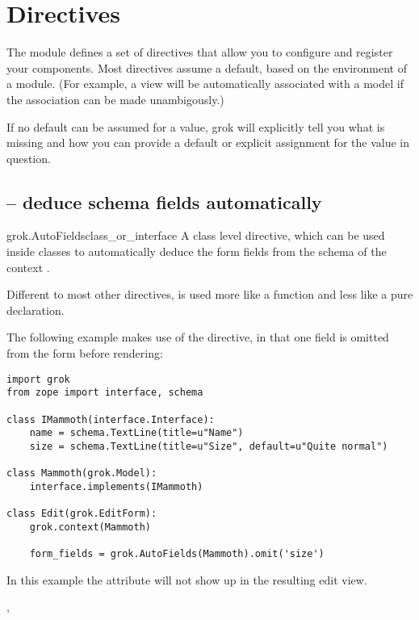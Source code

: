 \chapter{Directives}

The  module defines a set of directives that allow you to
configure and register your components. Most directives assume a
default, based on the environment of a module. (For example, a view
will be automatically associated with a model if the association can
be made unambigously.)

If no default can be assumed for a value, grok will explicitly tell
you what is missing and how you can provide a default or explicit
assignment for the value in question.


    \section{ -- deduce schema fields automatically}

        \begin{funcdesc}{grok.AutoFields}{class_or_interface}
          A class level directive, which can be used inside
           classes to automatically deduce the form fields
          from the schema of the context .

          Different to most other directives,
           is used more like a function and
          less like a pure declaration.

          The following example makes use of the
           directive, in that one field is
          omitted from the form before rendering:


          \begin{verbatim}
import grok
from zope import interface, schema

class IMammoth(interface.Interface):
    name = schema.TextLine(title=u"Name")
    size = schema.TextLine(title=u"Size", default=u"Quite normal")

class Mammoth(grok.Model):
    interface.implements(IMammoth)

class Edit(grok.EditForm):
    grok.context(Mammoth)

    form_fields = grok.AutoFields(Mammoth).omit('size')
          \end{verbatim}

          In this example the  attribute will not show up
          in the resulting edit view.

          \begin{seealso}
            , 
          \end{seealso}

        \end{funcdesc}

